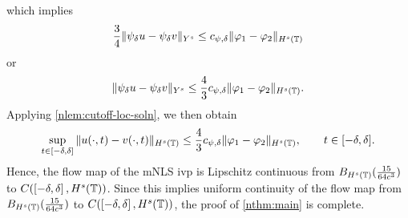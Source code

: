 %
%
which implies
%
%
\begin{equation*}
	\begin{split}
    \frac{3}{4} \|\psi_{\delta} u- \psi_{\delta} v\|_{Y^s} \le c_{\psi,\delta} \|\varphi_1 - \varphi_2 \|_{H^s(\mathbb{T})}
	\end{split}
\end{equation*}
%
%
or
%
%
\begin{equation*}
	\begin{split}
    \|\psi_{\delta} u - \psi_{\delta} v \|_{Y^s} \le \frac{4}{3} c_{\psi,\delta} \|\varphi_1 - \varphi_2 \|_{H^{s}(\mathbb{T})}.
	\end{split}
\end{equation*}
%
%
Applying \cref{nlem:cutoff-loc-soln}, we then obtain
%
%
	 \begin{equation*}
		 \begin{split}
       \sup_{t \in \left[ -\delta, \delta \right]}\|u(\cdot, t) -v(\cdot, t) \|_{H^s(\mathbb{T})} \le \frac{4}{3} c_{\psi,\delta} \|\varphi_1 -
			\varphi_2 \|_{H^{s}(\mathbb{T})}, \qquad t \in [-\delta, \delta].
		 \end{split}
	 \end{equation*}
   Hence, the flow map of the mNLS ivp is Lipschitz continuous from
   $B_{H^{s}(\mathbb{T})}( \frac{15}{64c^{3}})$ to  $C(\left[ -\delta, \delta \right],
   H^{s}(\mathbb{T}))$. Since this implies uniform continuity of the flow map from
   $B_{H^{s}(\mathbb{T})}( \frac{15}{64c^{3}})$ to  $C(\left[ -\delta, \delta \right],
   H^{s}(\mathbb{T}))$, the proof of \cref{nthm:main} is complete. \qquad
   \qedsymbol
%
%
%
%
